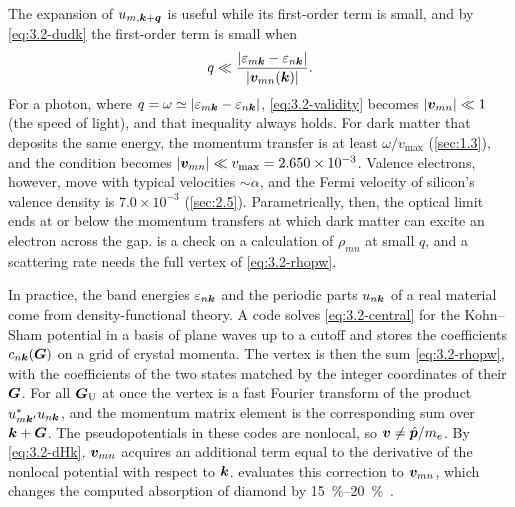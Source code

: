 The expansion of $u_{m,\bm{k}+\bm{q}}$ is useful while its first-order term is small, and by \cref{eq:3.2-dudk} the first-order term is small when
\begin{equation}
  q \ll \frac{|\varepsilon_{m\bm{k}} - \varepsilon_{n\bm{k}}|}{|\bm{v}_{mn}(\bm{k})|} .
  \label{eq:3.2-validity}
\end{equation}
For a photon, where $q = \omega \simeq |\varepsilon_{m\bm{k}} - \varepsilon_{n\bm{k}}|$, \cref{eq:3.2-validity} becomes $|\bm{v}_{mn}| \ll 1$ (the speed of light), and that inequality always holds. For dark matter that deposits the same energy, the momentum transfer is at least $\omega/v_{\mathrm{max}}$ (\cref{sec:1.3}), and the condition becomes $|\bm{v}_{mn}| \ll v_{\mathrm{max}} = 2.650\times10^{-3}$. Valence electrons, however, move with typical velocities $\sim\alpha$, and the Fermi velocity of silicon's valence density is $7.0\times10^{-3}$ (\cref{sec:2.5}). Parametrically, then, the optical limit ends at or below the momentum transfers at which dark matter can excite an electron across the gap.  is a check on a calculation of $\rho_{mn}$ at small $q$, and a scattering rate needs the full vertex of \cref{eq:3.2-rhopw}.

In practice, the band energies $\varepsilon_{n\bm{k}}$ and the periodic parts $u_{n\bm{k}}$ of a real material come from density-functional theory. A code solves \cref{eq:3.2-central} for the Kohn--Sham potential in a basis of plane waves up to a cutoff and stores the coefficients $c_{n\bm{k}}(\bm{G})$ on a grid of crystal momenta. The vertex is then the sum \cref{eq:3.2-rhopw}, with the coefficients of the two states matched by the integer coordinates of their $\bm{G}$. For all $\bm{G}_{\mathrm{U}}$ at once the vertex is a fast Fourier transform of the product $u^*_{m\bm{k}'}u_{n\bm{k}}$, and the momentum matrix element is the corresponding sum over $\bm{k} + \bm{G}$. The pseudopotentials in these codes are nonlocal, so $\bm{v} \neq \hat{\bm{p}}/m_e$. By \cref{eq:3.2-dHk}, $\bm{v}_{mn}$ acquires an additional term equal to the derivative of the nonlocal potential with respect to $\bm{k}$.  evaluates this correction to $\bm{v}_{mn}$, which changes the computed absorption of diamond by \SIrange{15}{20}{\percent}~\cite[Fig.~1]{ismailbeigi2001coupling}.

